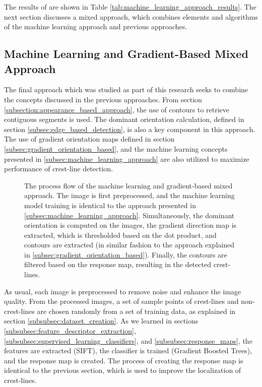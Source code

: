 The results of are shown in Table \ref{tab:machine_learning_approach_results}. The next section discusses a mixed approach, which combines elements and algorithms of the machine learning approach and previous approaches.



\subsection{Machine Learning and Gradient-Based Mixed Approach}\label{subsec:mixed_ml_gradient_approach}

The final approach which was studied as part of this research seeks to combine the concepts discussed in the previous approaches. From section \ref{subsection:appearance_based_approach}, the use of contours to retrieve contiguous segments is used. The dominant orientation calculation, defined in section \ref{subsec:edge_based_detection}, is also a key component in this approach. The use of gradient orientation maps defined in section \ref{subsec:gradient_orientation_based}, and the machine learning concepts presented in \ref{subsec:machine_learning_approach} are also utilized to maximize performance of crest-line detection.

\begin{figure}[H]
	\centering
	\caption{The process flow of the machine learning and gradient-based mixed approach. The image is first preprocessed, and the machine learning model training is identical to the approach presented in \ref{subsec:machine_learning_approach}. Simultaneously, the dominant orientation is computed on the images, the gradient direction map is extracted, which is thresholded based on the dot product, and contours are extracted (in similar fashion to the approach explained in \ref{subsec:gradient_orientation_based}). Finally, the contours are filtered based on the response map, resulting in the detected crest-lines. }
	\label{fig:flow_mixed}
\end{figure}

As usual, each image is preprocessed to remove noise and enhance the image quality. From the processed images, a set of sample points of crest-lines and non-crest-lines are chosen randomly from a set of training data, as explained in section \ref{subsubsec:dataset_creation}. As we learned in sections \ref{subsubsec:feature_descriptor_extraction}, \ref{subsubsec:supervised_learning_classifiers}, and \ref{subsubsec:response_maps}, the features are extracted (SIFT), the classifier is trained (Gradient Boosted Trees), and the response map is created. The process of creating the response map is identical to the previous section, which is used to improve the localization of crest-lines.

